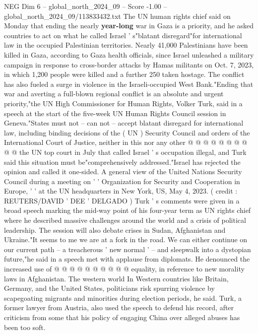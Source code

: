 \begin{textsample}{NEG Dim 6 – global\_north\_2024\_09 – Score -1.00 – global\_north\_2024\_09/113833432.txt}  \label{ex:f6_neg_089}
The UN human rights chief said on Monday that ending the nearly \textbf{year-long} war in Gaza is a priority, and he asked countries to act on what he called Israel ' s"blatant disregard"for international law in the occupied Palestinian territories.
Nearly 41,000 Palestinians have been killed in Gaza, according to Gaza health officials, since Israel unleashed a military campaign in response to cross-border attacks by Hamas militants on Oct. 7, 2023, in which 1,200 people were killed and a further 250 taken hostage.
The conflict has also fueled a surge in violence in the Israeli-occupied West Bank."Ending that war and averting a full-blown regional conflict is an absolute and urgent priority,"the UN High Commissioner for Human Rights, Volker Turk, said in a speech at the start of the five-week UN Human Rights Council session in Geneva."States must not -- can not -- accept blatant disregard for international law, including binding decisions of the ( UN ) Security Council and orders of the International Court of Justice, neither in this nor any other @ @ @ @ @ @ @ @ @ @ the UN top court in July that called Israel ' s occupation illegal, and Turk said this situation must be"comprehensively addressed."Israel has rejected the opinion and called it one-sided.
A general view of the United Nations Security Council during a meeting on ' ' Organization for Security and Cooperation in Europe, ' ' at the UN headquarters in New York, US, May 4, 2023. ( credit : REUTERS/DAVID ' DEE ' DELGADO ) Turk ' s comments were given in a broad speech marking the mid-way point of his four-year term as UN rights chief where he described massive challenges around the world and a crisis of political leadership.
The session will also debate crises in Sudan, Afghanistan and Ukraine."It seems to me we are at a fork in the road.
We can either continue on our current path -- a treacherous ' new normal ' -- and sleepwalk into a dystopian future,"he said in a speech met with applause from diplomats.
He denounced the increased use of @ @ @ @ @ @ @ @ @ @ equality, in reference to new morality laws in Afghanistan.
The western world In Western countries like Britain, Germany, and the United States, politicians risk spurring violence by scapegoating migrants and minorities during election periods, he said.
Turk, a former lawyer from Austria, also used the speech to defend his record, after criticism from some that his policy of engaging China over alleged abuses has been too soft.

\end{textsample}
